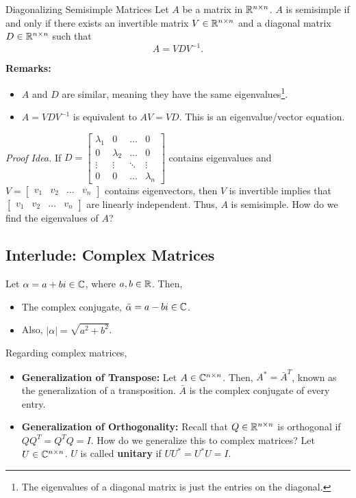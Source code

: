 \documentclass[letterpaper]{article}
\newcommand{\0}{\mathbf{0}}
\begin{document}
\begin{lemma}{Diagonalizing Semisimple Matrices}{}
    Let $A$ be a matrix in $\mathbb{R}^{n \times n}$. $A$ is semisimple if and only if there exists an invertible matrix $V \in \mathbb{R}^{n \times n}$ and a diagonal matrix $D \in \mathbb{R}^{n \times n}$ such that \[A = VDV^{-1}.\]
\end{lemma}
\textbf{Remarks:}
\begin{itemize}
    \item $A$ and $D$ are similar, meaning they have the same eigenvalues\footnote{The eigenvalues of a diagonal matrix is just the entries on the diagonal.}.
    \item $A = VDV^{-1}$ is equivalent to $AV = VD$. This is an eigenvalue/vector equation. 
\end{itemize} 
\emph{Proof Idea.} If $D = \begin{bmatrix}
    \lambda_1 & 0 & \hdots & 0 \\ 
    0 & \lambda_2 & \hdots & 0 \\ 
    \vdots & \vdots & \ddots & \vdots \\ 
    0 & 0 & \hdots & \lambda_n
\end{bmatrix}$ contains eigenvalues and $V = \begin{bmatrix}
    v_1 & v_2 & \hdots & v_n
\end{bmatrix}$ contains eigenvectors, then $V$ is invertible implies that $\begin{bmatrix}
    v_1 & v_2 & \hdots & v_n
\end{bmatrix}$ are linearly independent. Thus, $A$ is semisimple. How do we find the eigenvalues of $A$? 

\subsection{Interlude: Complex Matrices}
Let $\alpha = a + bi \in \mathbb{C}$, where $a, b \in \mathbb{R}$. Then, 
\begin{itemize}
    \item The complex conjugate, $\bar{\alpha} = a - bi \in \mathbb{C}$.
    \item Also, $|\alpha| = \sqrt{a^2 + b^2}$.
\end{itemize}

Regarding complex matrices, 
\begin{itemize}
    \item \textbf{Generalization of Transpose:} Let $A \in \mathbb{C}^{n \times n}$. Then, $A^* = \bar{A}^T$, known as the generalization of a transposition. $\bar{A}$ is the complex conjugate of every entry. 
    \item \textbf{Generalization of Orthogonality:} Recall that $Q \in \mathbb{R}^{n \times n}$ is orthogonal if $QQ^T = Q^T Q = I$. How do we generalize this to complex matrices? Let $U \in \mathbb{C}^{n \times n}$. $U$ is called \textbf{unitary} if $UU^* = U^*U = I$. 
\end{itemize}
\end{document}
